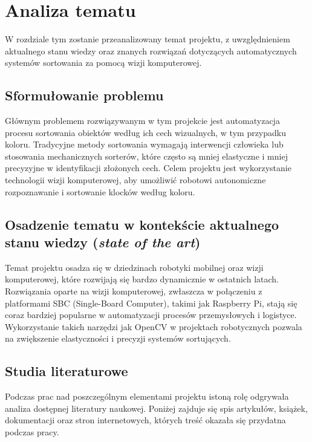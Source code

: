 \chapter{Analiza tematu}
\label{ch:analiza}

W rozdziale tym zostanie przeanalizowany temat projektu, z uwzględnieniem aktualnego stanu wiedzy oraz znanych rozwiązań dotyczących automatycznych systemów sortowania za pomocą wizji komputerowej.

\section{Sformułowanie problemu}
\label{sec:sformulowanie_problemu}

Głównym problemem rozwiązywanym w tym projekcie jest automatyzacja procesu sortowania obiektów według ich cech wizualnych, w tym przypadku koloru. Tradycyjne metody sortowania wymagają interwencji człowieka lub stosowania mechanicznych sorterów, które często są mniej elastyczne i mniej precyzyjne w identyfikacji złożonych cech. Celem projektu jest wykorzystanie technologii wizji komputerowej, aby umożliwić robotowi autonomiczne rozpoznawanie i sortowanie klocków według koloru.

\section{Osadzenie tematu w kontekście aktualnego stanu wiedzy (\textit{state of the art})}
\label{sec:state_of_the_art}

Temat projektu osadza się w dziedzinach robotyki mobilnej oraz wizji komputerowej, które rozwijają się bardzo dynamicznie w ostatnich latach. Rozwiązania oparte na wizji komputerowej, zwłaszcza w połączeniu z platformami SBC (Single-Board Computer), takimi jak Raspberry Pi, stają się coraz bardziej popularne w automatyzacji procesów przemysłowych i logistyce. Wykorzystanie takich narzędzi jak OpenCV w projektach robotycznych pozwala na zwiększenie elastyczności i precyzji systemów sortujących.

\section{Studia literaturowe}
\label{sec:studia_literaturowe}

Podczas prac nad poszczególnym elementami projektu istoną rolę odgrywała analiza dostępnej literatury naukowej. Poniżej zajduje się spis artykułów, książek, dokumentacji oraz stron internetowych, których treść okazała się przydatna podczas pracy. 

